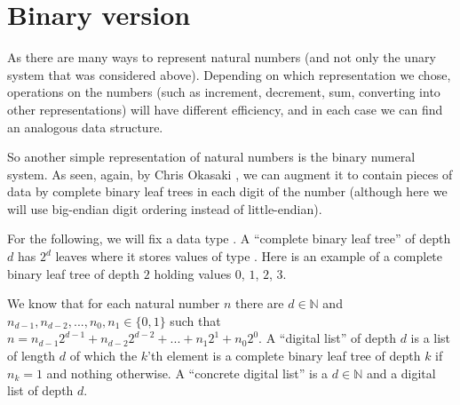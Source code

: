 \documentclass{article}
\newenvironment{no_padding_center}
    {\parskip=0pt\par\nopagebreak\centering}
    {\par\noindent}
\begin{document}
\section{Binary version}

As there are many ways to represent natural numbers (and not only the unary system that was considered above). Depending on which representation we chose, operations on the numbers (such as increment, decrement, sum, converting into other representations) will have different efficiency, and in each case we can find an analogous data structure.

So another simple representation of natural numbers is the binary numeral system. As seen, again, by Chris Okasaki \cite{okasaki_1998}, we can augment it to contain pieces of data by complete binary leaf trees in each digit of the number (although here we will use big-endian digit ordering instead of little-endian).

For the following, we will fix a data type . A ``complete binary leaf tree'' of depth $d$ has $2^d$ leaves where it stores values of type . Here is an example of a complete binary leaf tree of depth $2$ holding values $0$, $1$, $2$, $3$.

\begin{no_padding_center}
\end{no_padding_center}

We know that for each natural number $n$ there are $d \in \mathbb{N}$ and $n_{d - 1}, n_{d - 2}, ..., n_0, n_1 \in \{0, 1\}$ such that $n = n_{d - 1} 2^{d - 1} + n_{d - 2} 2^{d - 2} + ... + n_1 2^1 + n_0 2^0$. A ``digital list'' of depth $d$ is a list of length $d$ of which the $k$'th element is a complete binary leaf tree of depth $k$ if $n_k = 1$ and nothing otherwise. A ``concrete digital list'' is a $d \in \mathbb{N}$ and a digital list of depth $d$.
\end{document}
